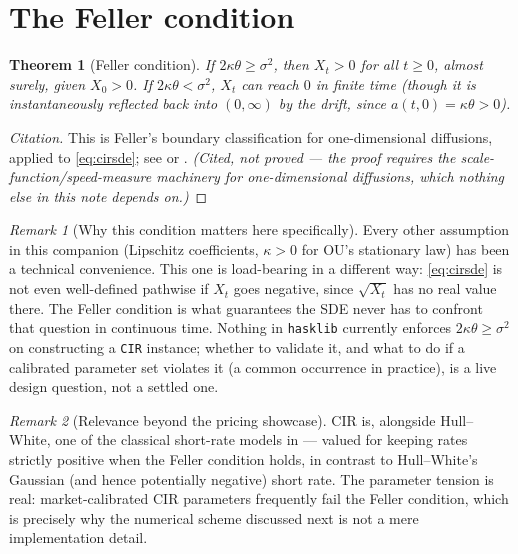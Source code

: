 \documentclass[11pt]{article}
\newcommand{\drift}{a}
\theoremstyle{plain}
\newtheorem{theorem}{Theorem}
\theoremstyle{definition}
\theoremstyle{remark}
\newtheorem{remark}{Remark}
\begin{document}
\section{The Feller condition}

\begin{theorem}[Feller condition]\label{thm:feller}
If $2\kappa\theta \ge \sigma^2$, then $X_t>0$ for all $t\ge0$, almost
surely, given $X_0>0$. If $2\kappa\theta < \sigma^2$, $X_t$ can reach
$0$ in finite time (though it is instantaneously reflected back into
$(0,\infty)$ by the drift, since $\drift(t,0)=\kappa\theta>0$).
\end{theorem}

\begin{proof}[Citation]
This is Feller's boundary classification for one-dimensional
diffusions, applied to \eqref{eq:cirsde}; see  or
. \emph{(Cited, not proved --- the proof
requires the scale-function/speed-measure machinery for
one-dimensional diffusions, which nothing else in this note depends
on.)}
\end{proof}

\begin{remark}[Why this condition matters here specifically]
Every other assumption in this companion (Lipschitz coefficients,
$\kappa>0$ for OU's stationary law) has been a technical convenience.
This one is load-bearing in a different way: \eqref{eq:cirsde} is not
even well-defined pathwise if $X_t$ goes negative, since
$\sqrt{X_t}$ has no real value there. The Feller condition is what
guarantees the SDE never has to confront that question in continuous
time. Nothing in \texttt{hasklib} currently enforces
$2\kappa\theta\ge\sigma^2$ on constructing a \texttt{CIR} instance;
whether to validate it, and what to do if a calibrated parameter set
violates it (a common occurrence in practice), is a live design
question, not a settled one.
\end{remark}

\begin{remark}[Relevance beyond the pricing showcase]
CIR is, alongside Hull--White, one of the classical short-rate models
in  --- valued for keeping rates
strictly positive when the Feller condition holds, in contrast to
Hull--White's Gaussian (and hence potentially negative) short rate.
The parameter tension is real: market-calibrated CIR parameters
frequently fail the Feller condition, which is precisely why the
numerical scheme discussed next is not a mere implementation detail.
\end{remark}
\end{document}
